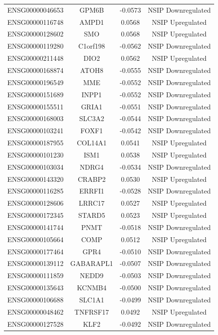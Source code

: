 \documentclass[
]{article}
\begin{document}
\begin{singlespace}
\begin{longtable}[t]{lccc}
ENSG00000046653 & GPM6B & -0.0573 & NSIP Downregulated\\
\addlinespace
ENSG00000116748 & AMPD1 & 0.0568 & NSIP Upregulated\\
ENSG00000128602 & SMO & 0.0568 & NSIP Upregulated\\
ENSG00000119280 & C1orf198 & -0.0562 & NSIP Downregulated\\
ENSG00000211448 & DIO2 & 0.0562 & NSIP Upregulated\\
ENSG00000168874 & ATOH8 & -0.0555 & NSIP Downregulated\\
\addlinespace
ENSG00000196549 & MME & -0.0552 & NSIP Downregulated\\
ENSG00000151689 & INPP1 & -0.0552 & NSIP Downregulated\\
ENSG00000155511 & GRIA1 & -0.0551 & NSIP Downregulated\\
ENSG00000168003 & SLC3A2 & -0.0544 & NSIP Downregulated\\
ENSG00000103241 & FOXF1 & -0.0542 & NSIP Downregulated\\
\addlinespace
ENSG00000187955 & COL14A1 & 0.0541 & NSIP Upregulated\\
ENSG00000101230 & ISM1 & 0.0538 & NSIP Upregulated\\
ENSG00000103034 & NDRG4 & -0.0534 & NSIP Downregulated\\
ENSG00000143320 & CRABP2 & 0.0530 & NSIP Upregulated\\
ENSG00000116285 & ERRFI1 & -0.0528 & NSIP Downregulated\\
\addlinespace
ENSG00000128606 & LRRC17 & 0.0527 & NSIP Upregulated\\
ENSG00000172345 & STARD5 & 0.0523 & NSIP Upregulated\\
ENSG00000141744 & PNMT & -0.0518 & NSIP Downregulated\\
ENSG00000105664 & COMP & 0.0512 & NSIP Upregulated\\
ENSG00000177464 & GPR4 & -0.0510 & NSIP Downregulated\\
\addlinespace
ENSG00000139112 & GABARAPL1 & -0.0507 & NSIP Downregulated\\
ENSG00000111859 & NEDD9 & -0.0503 & NSIP Downregulated\\
ENSG00000135643 & KCNMB4 & -0.0500 & NSIP Downregulated\\
ENSG00000106688 & SLC1A1 & -0.0499 & NSIP Downregulated\\
ENSG00000048462 & TNFRSF17 & 0.0492 & NSIP Upregulated\\
\addlinespace
ENSG00000127528 & KLF2 & -0.0492 & NSIP Downregulated\\

\end{longtable}
\end{singlespace}
\end{document}
